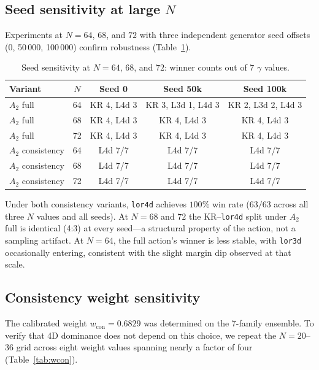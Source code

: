 \documentclass[12pt,a4paper]{article}
\begin{document}
\subsection{\texorpdfstring{Seed sensitivity at large $N$}{Seed sensitivity at large N}}
\label{sec:seed}

Experiments at $N = 64$, $68$, and $72$ with three independent generator seed
offsets (0, 50\,000, 100\,000) confirm robustness (Table~\ref{tab:seed}).

\begin{table}[h]
\centering
\caption{Seed sensitivity at $N = 64$, $68$, and $72$: winner counts out of 7
$\gamma$ values.}
\label{tab:seed}
\begin{tabular}{lcccc}
\toprule
\textbf{Variant} & $N$ & \textbf{Seed 0} & \textbf{Seed 50k} &
\textbf{Seed 100k} \\
\midrule
$A_2$ full & 64 & KR 4, L4d 3 & KR 3, L3d 1, L4d 3 & KR 2, L3d 2, L4d 3 \\
$A_2$ full & 68 & KR 4, L4d 3 & KR 4, L4d 3 & KR 4, L4d 3 \\
$A_2$ full & 72 & KR 4, L4d 3 & KR 4, L4d 3 & KR 4, L4d 3 \\
$A_2$ consistency & 64 & L4d 7/7 & L4d 7/7 & L4d 7/7 \\
$A_2$ consistency & 68 & L4d 7/7 & L4d 7/7 & L4d 7/7 \\
$A_2$ consistency & 72 & L4d 7/7 & L4d 7/7 & L4d 7/7 \\
\bottomrule
\end{tabular}
\end{table}

Under both consistency variants, \texttt{lor4d} achieves $100\%$ win rate
($63/63$ across all three $N$ values and all seeds). At $N = 68$ and $72$ the
KR--\texttt{lor4d} split under $A_2$ full is identical (4:3) at every
seed---a structural property of the action, not a sampling artifact. At
$N = 64$, the full action's winner is less stable, with \texttt{lor3d}
occasionally entering, consistent with the slight margin dip observed at that
scale.

\subsection{Consistency weight sensitivity}
\label{sec:wcon}

The calibrated weight $w_{\text{con}} = 0.6829$ was determined on the 7-family
ensemble. To verify that 4D dominance does not depend on this choice, we repeat
the $N = 20$--$36$ grid across eight weight values spanning nearly a factor of
four (Table~\ref{tab:wcon}).
\end{document}
